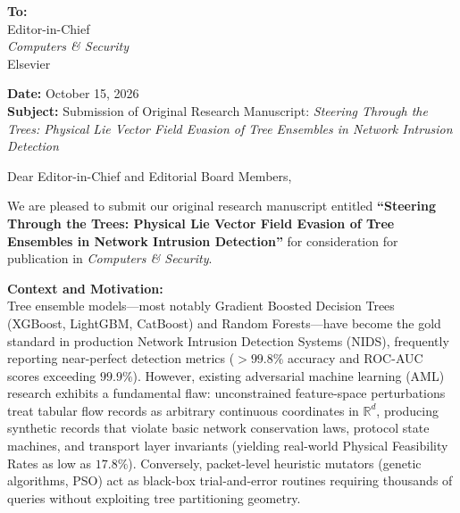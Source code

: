 \documentclass[11pt]{article}
\begin{document}
\noindent
\textbf{To:} \\
Editor-in-Chief \\
\textit{Computers \& Security} \\
Elsevier

\vspace{1em}

\noindent
\textbf{Date:} October 15, 2026 \\
\textbf{Subject:} Submission of Original Research Manuscript: \textit{Steering Through the Trees: Physical Lie Vector Field Evasion of Tree Ensembles in Network Intrusion Detection}

\vspace{1.5em}

\noindent
Dear Editor-in-Chief and Editorial Board Members,

\vspace{0.8em}

\noindent
We are pleased to submit our original research manuscript entitled \textbf{``Steering Through the Trees: Physical Lie Vector Field Evasion of Tree Ensembles in Network Intrusion Detection''} for consideration for publication in \textit{Computers \& Security}.

\vspace{0.8em}
\noindent
\textbf{Context and Motivation:} \\
Tree ensemble models---most notably Gradient Boosted Decision Trees (XGBoost, LightGBM, CatBoost) and Random Forests---have become the gold standard in production Network Intrusion Detection Systems (NIDS), frequently reporting near-perfect detection metrics ($>99.8\%$ accuracy and ROC-AUC scores exceeding $99.9\%$). However, existing adversarial machine learning (AML) research exhibits a fundamental flaw: unconstrained feature-space perturbations treat tabular flow records as arbitrary continuous coordinates in $\mathbb{R}^d$, producing synthetic records that violate basic network conservation laws, protocol state machines, and transport layer invariants (yielding real-world Physical Feasibility Rates as low as $17.8\%$). Conversely, packet-level heuristic mutators (genetic algorithms, PSO) act as black-box trial-and-error routines requiring thousands of queries without exploiting tree partitioning geometry.
\end{document}
